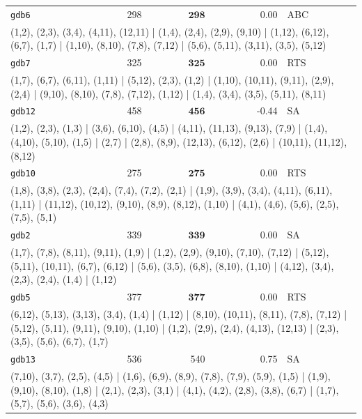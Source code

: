 \begin{longtable}{lrrrl}
\texttt{gdb6} & 298 & $\mathbf{298}$ & 0.00 & ABC \\
\multicolumn{5}{p{0.96\linewidth}}{\tiny\raggedright\arraybackslash (1,2), (2,3), (3,4), (4,11), (12,11) | (1,4), (2,4), (2,9), (9,10) | (1,12), (6,12), (6,7), (1,7) | (1,10), (8,10), (7,8), (7,12) | (5,6), (5,11), (3,11), (3,5), (5,12)} \\[2pt]
\texttt{gdb7} & 325 & $\mathbf{325}$ & 0.00 & RTS \\
\multicolumn{5}{p{0.96\linewidth}}{\tiny\raggedright\arraybackslash (1,7), (6,7), (6,11), (1,11) | (5,12), (2,3), (1,2) | (1,10), (10,11), (9,11), (2,9), (2,4) | (9,10), (8,10), (7,8), (7,12), (1,12) | (1,4), (3,4), (3,5), (5,11), (8,11)} \\[2pt]
\texttt{gdb12} & 458 & $\mathbf{456}$ & -0.44 & SA \\
\multicolumn{5}{p{0.96\linewidth}}{\tiny\raggedright\arraybackslash (1,2), (2,3), (1,3) | (3,6), (6,10), (4,5) | (4,11), (11,13), (9,13), (7,9) | (1,4), (4,10), (5,10), (1,5) | (2,7) | (2,8), (8,9), (12,13), (6,12), (2,6) | (10,11), (11,12), (8,12)} \\[2pt]
\texttt{gdb10} & 275 & $\mathbf{275}$ & 0.00 & RTS \\
\multicolumn{5}{p{0.96\linewidth}}{\tiny\raggedright\arraybackslash (1,8), (3,8), (2,3), (2,4), (7,4), (7,2), (2,1) | (1,9), (3,9), (3,4), (4,11), (6,11), (1,11) | (11,12), (10,12), (9,10), (8,9), (8,12), (1,10) | (4,1), (4,6), (5,6), (2,5), (7,5), (5,1)} \\[2pt]
\texttt{gdb2} & 339 & $\mathbf{339}$ & 0.00 & SA \\
\multicolumn{5}{p{0.96\linewidth}}{\tiny\raggedright\arraybackslash (1,7), (7,8), (8,11), (9,11), (1,9) | (1,2), (2,9), (9,10), (7,10), (7,12) | (5,12), (5,11), (10,11), (6,7), (6,12) | (5,6), (3,5), (6,8), (8,10), (1,10) | (4,12), (3,4), (2,3), (2,4), (1,4) | (1,12)} \\[2pt]
\texttt{gdb5} & 377 & $\mathbf{377}$ & 0.00 & RTS \\
\multicolumn{5}{p{0.96\linewidth}}{\tiny\raggedright\arraybackslash (6,12), (5,13), (3,13), (3,4), (1,4) | (1,12) | (8,10), (10,11), (8,11), (7,8), (7,12) | (5,12), (5,11), (9,11), (9,10), (1,10) | (1,2), (2,9), (2,4), (4,13), (12,13) | (2,3), (3,5), (5,6), (6,7), (1,7)} \\[2pt]
\texttt{gdb13} & 536 & 540 & 0.75 & SA \\
\multicolumn{5}{p{0.96\linewidth}}{\tiny\raggedright\arraybackslash (7,10), (3,7), (2,5), (4,5) | (1,6), (6,9), (8,9), (7,8), (7,9), (5,9), (1,5) | (1,9), (9,10), (8,10), (1,8) | (2,1), (2,3), (3,1) | (4,1), (4,2), (2,8), (3,8), (6,7) | (1,7), (5,7), (5,6), (3,6), (4,3)} \\[2pt]

\end{longtable}
